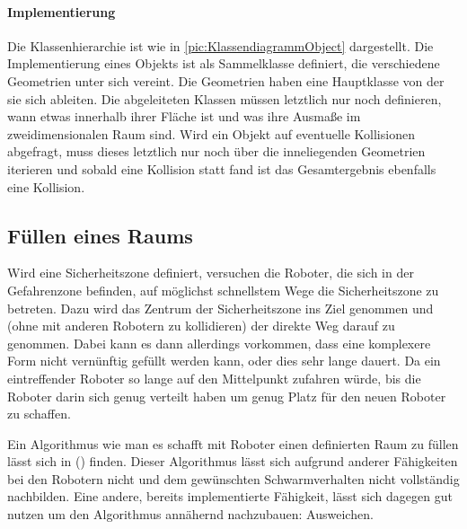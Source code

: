 \paragraph*{Implementierung}
Die Klassenhierarchie ist wie in \autoref{pic:KlassendiagrammObject} dargestellt. Die Implementierung eines Objekts ist als Sammelklasse definiert, die verschiedene Geometrien unter sich vereint. Die Geometrien haben eine Hauptklasse von der sie sich ableiten. Die abgeleiteten Klassen müssen letztlich nur noch definieren, wann etwas innerhalb ihrer Fläche ist und was ihre Ausmaße im zweidimensionalen Raum sind. Wird ein Objekt auf eventuelle Kollisionen abgefragt, muss dieses letztlich nur noch über die inneliegenden Geometrien iterieren und sobald eine Kollision statt fand ist das Gesamtergebnis ebenfalls eine Kollision.

\subsection*{Füllen eines Raums}

Wird eine Sicherheitszone definiert, versuchen die Roboter, die sich in der Gefahrenzone befinden, auf möglichst schnellstem Wege die Sicherheitszone zu betreten. Dazu wird das Zentrum der Sicherheitszone ins Ziel genommen und (ohne mit anderen Robotern zu kollidieren) der direkte Weg darauf zu genommen. Dabei kann es dann allerdings vorkommen, dass eine komplexere Form nicht vernünftig gefüllt werden kann, oder dies sehr lange dauert. Da ein eintreffender Roboter so lange auf den Mittelpunkt zufahren würde, bis die Roboter darin sich genug verteilt haben um genug Platz für den neuen Roboter zu schaffen.

Ein Algorithmus wie man es schafft mit Roboter einen definierten Raum zu füllen lässt sich in () finden. Dieser Algorithmus lässt sich aufgrund anderer Fähigkeiten bei den Robotern nicht und dem gewünschten Schwarmverhalten nicht vollständig nachbilden. Eine andere, bereits implementierte Fähigkeit, lässt sich dagegen gut nutzen um den Algorithmus annähernd nachzubauen: Ausweichen.

